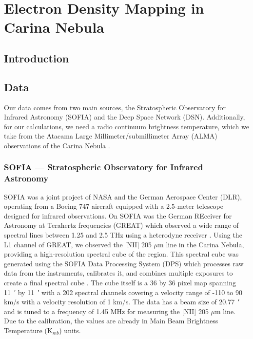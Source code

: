 \chapter[Electron Density Mapping in Carina Nebula]{Electron Density Mapping in Carina Nebula}
\label{ch:carina}
\section{Introduction}
\section{Data}
Our data comes from two main sources, the Stratospheric Observatory for Infrared Astronomy (SOFIA) and the Deep Space Network (DSN).
Additionally, for our calculations, we need a radio continuum brightness temperature, which we take from the Atacama Large Millimeter/submillimeter Array (ALMA) observations of the Carina Nebula \parencite{Rebolledo_2021}.

\subsection{SOFIA --- Stratospheric Observatory for Infrared Astronomy}
SOFIA was a joint project of NASA and the German Aerospace Center (DLR), operating from a Boeing 747 aircraft equipped with a 2.5-meter telescope designed for infrared observations.
On SOFIA was the German REceiver for Astronomy at Terahertz frequencies (GREAT) which observed a wide range of spectral lines between 1.25 and 2.5 THz using a heterodyne receiver \parencite{heyminck2012great}.
Using the L1 channel of GREAT, we observed the [NII] 205 $\mu$m line in the Carina Nebula, providing a high-resolution spectral cube of the region.
This spectral cube was generated using the SOFIA Data Processing System (DPS) which processes raw data from the instruments, calibrates it, and combines multiple exposures to create a final spectral cube \parencite{shuping2014overview}.
The cube itself is a 36 by 36 pixel map spanning \qty{11}{\arcminute} by \qty{11}{\arcminute} with a 202 spectral channels covering a velocity range of -110 to 90 km/s with a velocity resolution of 1 km/s.
The data has a beam size of \qty{20.77}{\arcminute}  and is tuned to a frequency of 1.45 MHz for measuring the [NII] 205 $\mu$m line.
Due to the calibration, the values are already in Main Beam Brightness Temperature (K$_{mb}$) units.

